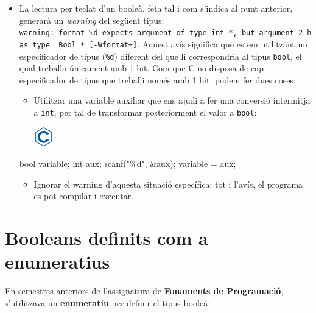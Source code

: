 \documentclass[
]{book}
\newenvironment{Shaded}{\begin{snugshade}}{\end{snugshade}}
\newcommand{\DataTypeTok}[1]{\textcolor[rgb]{0.13,0.29,0.53}{#1}}
\newcommand{\NormalTok}[1]{#1}
\newcommand{\StringTok}[1]{\textcolor[rgb]{0.31,0.60,0.02}{#1}}
\providecommand{\tightlist}{%
  \setlength{\itemsep}{0pt}\setlength{\parskip}{0pt}}
\begin{document}
\begin{itemize}
\tightlist
\item
  La lectura per teclat d'un booleà, feta tal i com s'indica al punt anterior, generarà un \emph{warning} del següent tipus: \texttt{warning:\ format\ \textquotesingle{}\%d\textquotesingle{}\ expects\ argument\ of\ type\ \textquotesingle{}int\ *\textquotesingle{},\ but\ argument\ 2\ has\ type\ \textquotesingle{}\_Bool\ *\textquotesingle{}\ {[}-Wformat={]}}. Aquest avís significa que estem utilitzant un especificador de tipus (\texttt{\%d}) diferent del que li correspondria al tipus \texttt{bool}, el qual treballa únicament amb 1 bit. Com que C no disposa de cap especificador de tipus que treballi només amb 1 bit, podem fer dues coses:

  \begin{itemize}
  \tightlist
  \item
    Utilitzar una variable auxiliar que ens ajudi a fer una conversió intermitja a \texttt{int}, per tal de transformar posteriorment el valor a \texttt{bool}:

    \includegraphics{./img/c.png}
  \end{itemize}

\begin{Shaded}
\begin{Highlighting}[]
\DataTypeTok{bool}\NormalTok{ variable;}
\DataTypeTok{int}\NormalTok{ aux;}
\NormalTok{scanf(}\StringTok{"\%d"}\NormalTok{, \&aux);}
\NormalTok{variable = aux;}
\end{Highlighting}
\end{Shaded}

  \begin{itemize}
  \tightlist
  \item
    Ignorar el warning d'aquesta situació específica: tot i l'avís, el programa es pot compilar i executar.
  \end{itemize}
\end{itemize}

\hypertarget{booleans-definits-com-a-enumeratius}{%
\section{Booleans definits com a enumeratius}\label{booleans-definits-com-a-enumeratius}}

En semestres anteriors de l'assignatura de \textbf{Fonaments de Programació}, s'utilitzava un \textbf{enumeratiu} per definir el tipus booleà:
\end{document}
